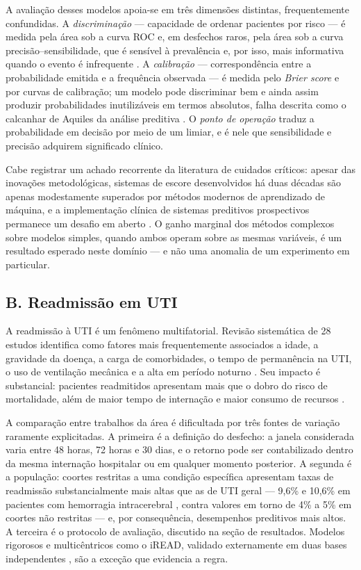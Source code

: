 \documentclass{ieeeaccess}
\begin{document}
A avaliação desses modelos apoia-se em três dimensões distintas, frequentemente confundidas. A \textit{discriminação} --- capacidade de ordenar pacientes por risco --- é medida pela área sob a curva ROC e, em desfechos raros, pela área sob a curva precisão--sensibilidade, que é sensível à prevalência e, por isso, mais informativa quando o evento é infrequente \cite{Saito2015}. A \textit{calibração} --- correspondência entre a probabilidade emitida e a frequência observada --- é medida pelo \textit{Brier score} e por curvas de calibração; um modelo pode discriminar bem e ainda assim produzir probabilidades inutilizáveis em termos absolutos, falha descrita como o calcanhar de Aquiles da análise preditiva \cite{VanCalster2019}. O \textit{ponto de operação} traduz a probabilidade em decisão por meio de um limiar, e é nele que sensibilidade e precisão adquirem significado clínico.

Cabe registrar um achado recorrente da literatura de cuidados críticos: apesar das inovações metodológicas, sistemas de escore desenvolvidos há duas décadas são apenas modestamente superados por métodos modernos de aprendizado de máquina, e a implementação clínica de sistemas preditivos prospectivos permanece um desafio em aberto \cite{Patton2023}. O ganho marginal dos métodos complexos sobre modelos simples, quando ambos operam sobre as mesmas variáveis, é um resultado esperado neste domínio --- e não uma anomalia de um experimento em particular.

\subsection*{B. Readmissão em UTI}
A readmissão à UTI é um fenômeno multifatorial. Revisão sistemática de 28 estudos identifica como fatores mais frequentemente associados a idade, a gravidade da doença, a carga de comorbidades, o tempo de permanência na UTI, o uso de ventilação mecânica e a alta em período noturno \cite{Badilla2025}. Seu impacto é substancial: pacientes readmitidos apresentam mais que o dobro do risco de mortalidade, além de maior tempo de internação e maior consumo de recursos \cite{Koumantakis2025}.

A comparação entre trabalhos da área é dificultada por três fontes de variação raramente explicitadas. A primeira é a definição do desfecho: a janela considerada varia entre 48 horas, 72 horas e 30 dias, e o retorno pode ser contabilizado dentro da mesma internação hospitalar ou em qualquer momento posterior. A segunda é a população: coortes restritas a uma condição específica apresentam taxas de readmissão substancialmente mais altas que as de UTI geral --- 9,6\% e 10,6\% em pacientes com hemorragia intracerebral \cite{Miao2024}, contra valores em torno de 4\% a 5\% em coortes não restritas --- e, por consequência, desempenhos preditivos mais altos. A terceira é o protocolo de avaliação, discutido na seção de resultados. Modelos rigorosos e multicêntricos como o iREAD, validado externamente em duas bases independentes \cite{Lim2025}, são a exceção que evidencia a regra.
\end{document}
